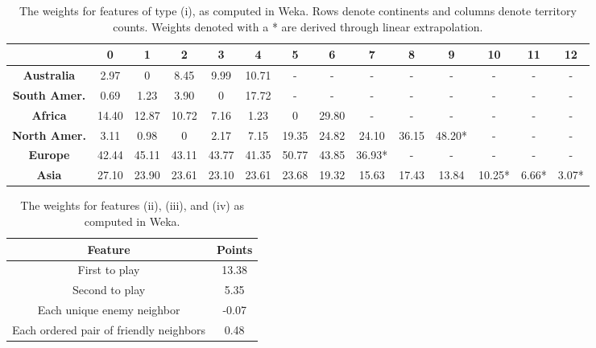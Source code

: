 \documentclass[letterpaper]{article}
\numberwithin{equation}{section}
\numberwithin{theorem}{section}
\numberwithin{lemma}{section}
\numberwithin{df}{section}
\begin{document}
\begin{table}[t]
 \centering
      \caption{The weights for features of type (i), as computed in Weka.  Rows denote continents and columns denote territory counts.  Weights denoted with a * are derived through linear extrapolation.}
    \label{tab:ContScoring}
    \begin{footnotesize}
    \begin{tabular}{|c|c|c|c|c|c|c|c|c|c|c|c|c|c|}
    	\hline
    	  & \bf 0 & \bf 1 & \bf 2  & \bf 3 & \bf 4 & \bf 5 & \bf 6 & \bf 7 & \bf 8 & \bf 9 & \bf 10 & \bf 11 & \bf 12 \\
    	 \hline
    	\bf Australia & 2.97 & 0 & 8.45 & 9.99 & 10.71 & - & - & - & - & - & - & - & - \\
    	\hline
    	\bf South Amer. & 0.69 & 1.23 & 3.90 & 0 & 17.72 & - & - & - & - & - & - & - & - \\
    	\hline
    	\bf Africa & 14.40 & 12.87 & 10.72 & 7.16 & 1.23 & 0 & 29.80 & - & - & - & - & - & - \\
    	\hline
    	\bf North Amer. & 3.11 & 0.98 & 0 & 2.17 & 7.15 & 19.35 & 24.82 & 24.10 & 36.15 & 48.20* & - & - & - \\
    	\hline
    	\bf Europe & 42.44 & 45.11 & 43.11 & 43.77 & 41.35 & 50.77 & 43.85 & 36.93* & - & - & - & - & - \\
    	\hline
    	\bf Asia & 27.10 & 23.90 & 23.61 & 23.10 & 23.61 & 23.68 & 19.32 & 15.63 & 17.43 & 13.84 & 10.25* & 6.66* & 3.07* \\
    	\hline
    \end{tabular}
    \end{footnotesize}
\end{table}

\begin{table}[t]
	\centering
		\caption{The weights for features (ii), (iii), and (iv) as computed in Weka.} 
		\label{tab:MoreScoring}
		\begin{footnotesize}
		\begin{tabular}{|c|c|}
			\hline
			\textbf{Feature} & \textbf{Points} \\
			\hline
			First to play & 13.38 \\
			\hline
			Second to play & 5.35 \\
			\hline
			Each unique enemy neighbor & -0.07 \\
			\hline
			Each ordered pair of friendly neighbors & 0.48 \\
			\hline
		\end{tabular}
		\end{footnotesize}
	
\end{table}
\end{document}
